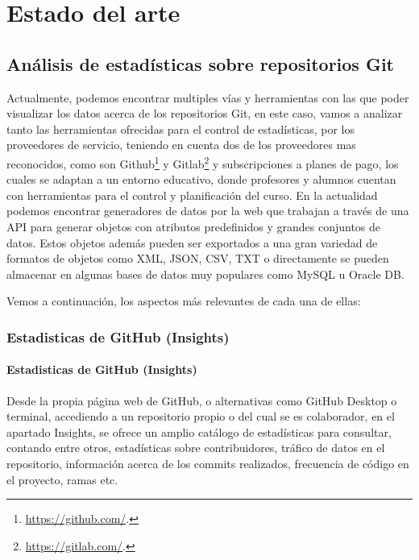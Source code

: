 \chapter{Estado del arte\label{02estadoArte}}

\section{Análisis de estadísticas sobre repositorios Git}

Actualmente, podemos encontrar multiples vías y herramientas con las que
poder visualizar los datos acerca de los repositorios Git, en este caso,
vamos a analizar tanto las herramientas ofrecidas para el control de
estadísticas, por los proveedores de servicio, teniendo en cuenta dos de
los proveedores mas reconocidos, como son
Github\footnote{\url{https://github.com/}.} y
Gitlab\footnote{\url{https://gitlab.com/}.} y subscripciones a planes de
pago, los cuales se adaptan a un entorno educativo, donde profesores y
alumnos cuentan con herramientas para el control y planificación del curso.
En la actualidad podemos encontrar generadores de datos por la web que
trabajan a través de una API para generar objetos con atributos
predefinidos y grandes conjuntos de datos. Estos objetos además pueden ser
exportados a una gran variedad de formatos de objetos como XML, JSON, CSV,
TXT o directamente se pueden almacenar en algunas bases de datos muy
populares como MySQL u Oracle DB.

Vemos a continuación, los aspectos más relevantes de cada una de ellas:


\subsection{Estadisticas de GitHub (Insights)}

\subsubsection{Estadisticas de GitHub (Insights)}

Desde la propia página web de GitHub, o alternativas como GitHub Desktop o
terminal, accediendo a un repositorio propio o del cual se es colaborador,
en el apartado Insights, se ofrece un amplio catálogo de estadísticas para
consultar, contando entre otros, estadísticas sobre contribuidores, tráfico
de datos en el repositorio, información acerca de los commits realizados,
frecuencia de código en el proyecto, ramas etc.

